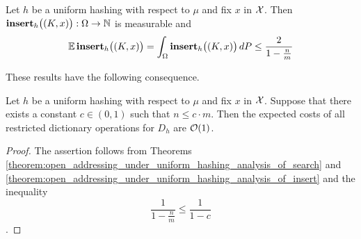 \begin{theorem}\label{theorem:open_addressing_under_uniform_hashing_analysis_of_insert}
Let $h$ be a uniform hashing with respect to $\mu$ and fix $x$ in ${\mathcal X}$. Then $\mathbf{insert}_h\big((K,x)\big):\Omega \rightarrow {\mathbb N}$ is measurable and
$$\mathbb{E}\,\mathbf{insert}_h\big((K,x)\big) = \int_{\Omega}\mathbf{insert}_h\big((K,x)\big)\,dP \leq \frac{2}{1 - \frac{n}{m}}$$    
\end{theorem}
\noindent
These results have the following consequence.

\begin{corollary}\label{corollary:constant_expected_costs_of_restricted_dictionary_operations_for_uniform_hashing}
Let $h$ be a uniform hashing with respect to $\mu$ and fix $x$ in ${\mathcal X}$. Suppose that there exists a constant $c\in (0,1)$ such that $n\leq c\cdot m$. Then the expected costs of all restricted dictionary operations for $D_h$ are ${\mathcal O}(1)$.
\end{corollary}
\begin{proof}
The assertion follows from Theorems \ref{theorem:open_addressing_under_uniform_hashing_analysis_of_search} and \ref{theorem:open_addressing_under_uniform_hashing_analysis_of_insert} and the inequality 
$$\frac{1}{1 - \frac{n}{m}} \leq \frac{1}{1 - c}$$.
\end{proof}




















\small



